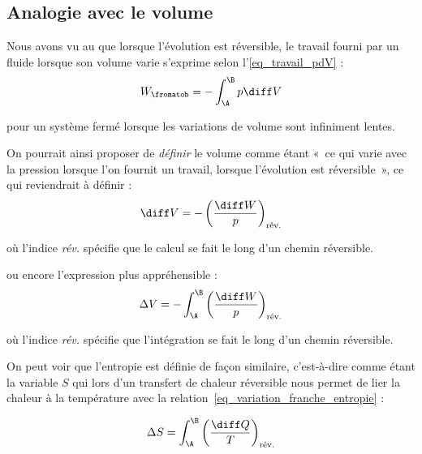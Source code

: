 	\subsection{Analogie avec le volume}
	
		Nous avons vu au \coursdeux que lorsque l’évolution est réversible, le travail fourni par un fluide lorsque son volume varie s’exprime selon l’\cref{eq_travail_pdV} :
		\begin{equation}
			W_\fromatob = -\int_\A^\B p \diff V
		\end{equation}

		\begin{equationterms}
			\item pour un système fermé lorsque les variations de volume sont infiniment lentes.
		\end{equationterms}

		On pourrait ainsi proposer de \emph{définir} le volume comme étant «~ce qui varie avec la pression lorsque l’on fournit un travail, lorsque l’évolution est réversible~», ce qui reviendrait à définir :
		\begin{equation}
			\diff V = - \left( \frac{\diff W}{p} \right)_\text{rév.}
		\end{equation}

		\begin{equationterms}
			\item où l’indice \textit{rév.} spécifie que le calcul se fait le long d’un chemin réversible.
		\end{equationterms}

		ou encore l’expression plus appréhensible :
		\begin{equation}
			\Delta V = -\int_\A^\B \left( \frac{\diff W}{p} \right)_\text{rév.}
			\label{eq_redéfinition_volume}
		\end{equation}

		\begin{equationterms}
			\item où l’indice \textit{rév.} spécifie que l’intégration se fait le long d’un chemin réversible.
		\end{equationterms}


		On peut voir que l’entropie est définie de façon similaire, c’est-à-dire comme étant la variable $S$ qui lors d’un transfert de chaleur réversible nous permet de lier la chaleur à la température avec la relation~\ref{eq_variation_franche_entropie} :
		
			\begin{equation*}
				\Delta S = \int_\A^\B \left( \frac{\diff Q}{T} \right)_\text{rév.}
			\end{equation*}

